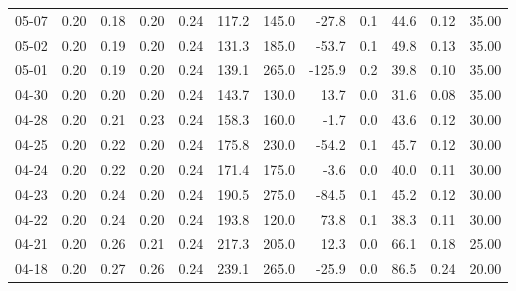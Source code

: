 \begin{threeparttable}
{\begin{tabular}{lrrrrrrrrrrr}
  05-07 &          0.20 &          0.18 &          0.20 &        0.24 &               117.2 &               145.0 &      -27.8 &                 0.1 &             44.6 &            0.12 &                  35.00 \\
  05-02 &          0.20 &          0.19 &          0.20 &        0.24 &               131.3 &               185.0 &      -53.7 &                 0.1 &             49.8 &            0.13 &                  35.00 \\
  05-01 &          0.20 &          0.19 &          0.20 &        0.24 &               139.1 &               265.0 &     -125.9 &                 0.2 &             39.8 &            0.10 &                  35.00 \\
  04-30 &          0.20 &          0.20 &          0.20 &        0.24 &               143.7 &               130.0 &       13.7 &                 0.0 &             31.6 &            0.08 &                  35.00 \\
  04-28 &          0.20 &          0.21 &          0.23 &        0.24 &               158.3 &               160.0 &       -1.7 &                 0.0 &             43.6 &            0.12 &                  30.00 \\
  04-25 &          0.20 &          0.22 &          0.20 &        0.24 &               175.8 &               230.0 &      -54.2 &                 0.1 &             45.7 &            0.12 &                  30.00 \\
  04-24 &          0.20 &          0.22 &          0.20 &        0.24 &               171.4 &               175.0 &       -3.6 &                 0.0 &             40.0 &            0.11 &                  30.00 \\
  04-23 &          0.20 &          0.24 &          0.20 &        0.24 &               190.5 &               275.0 &      -84.5 &                 0.1 &             45.2 &            0.12 &                  30.00 \\
  04-22 &          0.20 &          0.24 &          0.20 &        0.24 &               193.8 &               120.0 &       73.8 &                 0.1 &             38.3 &            0.11 &                  30.00 \\
  04-21 &          0.20 &          0.26 &          0.21 &        0.24 &               217.3 &               205.0 &       12.3 &                 0.0 &             66.1 &            0.18 &                  25.00 \\
  04-18 &          0.20 &          0.27 &          0.26 &        0.24 &               239.1 &               265.0 &      -25.9 &                 0.0 &             86.5 &            0.24 &                  20.00 \\

\end{tabular}}
\end{threeparttable}
